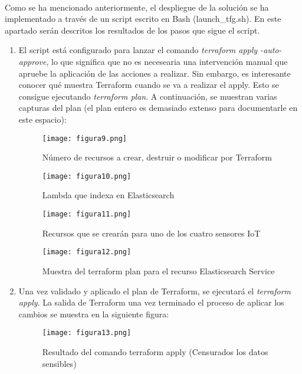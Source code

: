 \documentclass[../../memoria.tex]{subfiles}
\begin{document}
\paragraph{}
Como se ha mencionado anteriormente, el despliegue de la solución se ha implementado a través de un script escrito en Bash (launch\_tfg.sh). En este apartado serán descritos los resultados de los pasos que sigue el script.

\begin{enumerate}
    \item El script está configurado para lanzar el comando \textit{terraform apply -auto-approve}, lo que significa que no es necesearia una intervención manual que apruebe la aplicación de las acciones a realizar. Sin embargo, es interesante conocer qué muestra Terraform cuando se va a realizar el apply. Esto se consigue ejecutando \textit{terraform plan}. A continuación, se muestran varias capturas del plan (el plan entero es demasiado extenso para documentarle en este espacio):
          \begin{figure}[H]
              \centering
              \texttt{[image: figura9.png]}
              \caption{Número de recursos a crear, destruir o modificar por Terraform}
              \label{fig:figura9}
          \end{figure}
          \begin{figure}[H]
              \centering
              \texttt{[image: figura10.png]}
              \caption{Lambda que indexa en Elasticsearch}
              \label{fig:figura10}
          \end{figure}
          \begin{figure}[H]
              \centering
              \texttt{[image: figura11.png]}
              \caption{Recursos que se crearán para uno de los cuatro sensores IoT}
              \label{fig:figura11}
          \end{figure}
          \begin{figure}[H]
              \centering
              \texttt{[image: figura12.png]}
              \caption{Muestra del terraform plan para el recurso Elasticsearch Service}
              \label{fig:figura12}
          \end{figure}

    \item Una vez validado y aplicado el plan de Terraform, se ejecutará el \textit{terraform apply}. La salida de Terraform una vez terminado el proceso de aplicar los cambios se muestra en la siguiente figura:
          \begin{figure}[H]
              \centering
              \texttt{[image: figura13.png]}
              \caption{Resultado del comando terraform apply (Censurados los datos sensibles)}
              \label{fig:figura13}
          \end{figure}


\end{enumerate}
\end{document}
